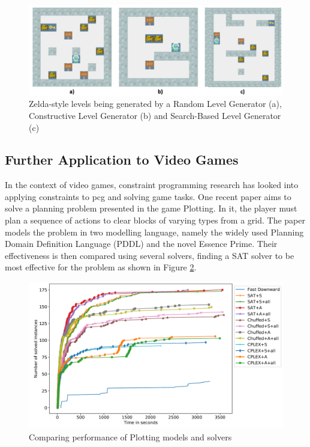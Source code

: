 \begin{figure}[H]
    \centering
    \includegraphics[width=\textwidth, height=0.3\textheight, keepaspectratio]{Images/GVGAILevels.png}
    \caption{Zelda-style levels being generated by a Random Level Generator (a), Constructive Level Generator (b) and Search-Based Level Generator (c) \cite{GVG-AI_and_VGDL_Level_Generators}}
    \label{fig:gvgAILevels}
\end{figure}

\subsection{Further Application to Video Games}
In the context of video games, constraint programming research has looked into applying constraints to \acrshort{pcg} and solving game tasks. One recent paper \cite{Plotting_Planning_Problem} aims to solve a planning problem presented in the game Plotting. In it, the player must plan a sequence of actions to clear blocks of varying types from a grid. The paper models the problem in two modelling language, namely the widely used Planning Domain Definition Language (PDDL) and the novel Essence Prime. Their effectiveness is then compared using several solvers, finding a SAT solver to be most effective for the problem as shown in Figure \ref{fig:plottingSolverComparison}.

\begin{figure}[H]
    \centering
    \includegraphics[width=\textwidth, height=0.3\textheight, keepaspectratio]{Images/PlottingSolverComparison.png}
    \caption{Comparing performance of Plotting models and solvers  \cite{Plotting_Planning_Problem}}
    \label{fig:plottingSolverComparison}
\end{figure}

